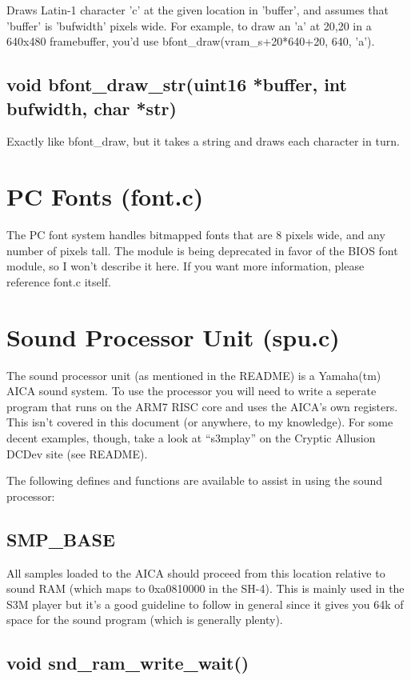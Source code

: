 \documentclass[english]{report}
\begin{document}
Draws Latin-1 character 'c' at the given location in 'buffer', and
assumes that 'buffer' is 'bufwidth' pixels wide. For example, to draw
an 'a' at 20,20 in a 640x480 framebuffer, you'd use bfont\_draw(vram\_s+20*640+20,
640, 'a').


\subsection{void bfont\_draw\_str(uint16 *buffer, int bufwidth, char *str)}

Exactly like bfont\_draw, but it takes a string and draws each character
in turn.


\section{PC Fonts (font.c)}

The PC font system handles bitmapped fonts that are 8 pixels wide,
and any number of pixels tall. The module is being deprecated in favor
of the BIOS font module, so I won't describe it here. If you want
more information, please reference font.c itself.


\section{Sound Processor Unit (spu.c)}

The sound processor unit (as mentioned in the README) is a Yamaha(tm)
AICA sound system. To use the processor you will need to write a seperate
program that runs on the ARM7 RISC core and uses the AICA's own registers.
This isn't covered in this document (or anywhere, to my knowledge).
For some decent examples, though, take a look at ``s3mplay'' on
the Cryptic Allusion DCDev site (see README).

The following defines and functions are available to assist in using
the sound processor:


\subsection{SMP\_BASE}

All samples loaded to the AICA should proceed from this location relative
to sound RAM (which maps to 0xa0810000 in the SH-4). This is mainly
used in the S3M player but it's a good guideline to follow in general
since it gives you 64k of space for the sound program (which is generally
plenty).


\subsection{void snd\_ram\_write\_wait()}
\end{document}

